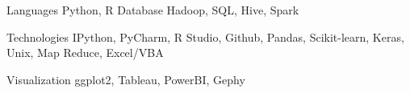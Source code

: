 

\begin{cvskills}

  \cvskill
    {Languages} %
    {Python, R} %
  \cvskill
    {Database} %
    {Hadoop, SQL, Hive, Spark} %
    
  \cvskill
    {Technologies} %
    {IPython, PyCharm, R Studio, Github, Pandas, Scikit-learn, Keras, Unix, Map Reduce, Excel/VBA} %

  \cvskill
    {Visualization} %
    {ggplot2, Tableau, PowerBI, Gephy}
    
\end{cvskills}